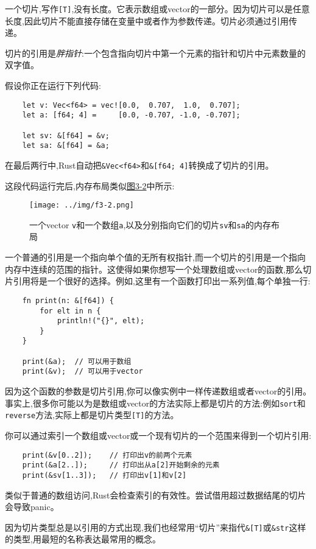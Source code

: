 一个切片,写作\texttt{[T]},没有长度。它表示数组或vector的一部分。因为切片可以是任意长度,因此切片不能直接存储在变量中或者作为参数传递。切片必须通过引用传递。

切片的引用是\emph{胖指针}:一个包含指向切片中第一个元素的指针和切片中元素数量的双字值。

假设你正在运行下列代码:
\begin{verbatim}
    let v: Vec<f64> = vec![0.0,  0.707,  1.0,  0.707];
    let a: [f64; 4] =     [0.0, -0.707, -1.0, -0.707];

    let sv: &[f64] = &v;
    let sa: &[f64] = &a;
\end{verbatim}

在最后两行中,Rust自动把\texttt{\&Vec<f64>}和\texttt{\&[f64; 4]}转换成了切片的引用。

这段代码运行完后,内存布局类似\hyperref[f3-2]{图3-2}中所示:
\begin{figure}[htbp]
    \centering
    \texttt{[image: ../img/f3-2.png]}
    \caption{一个vector \texttt{v}和一个数组\texttt{a},以及分别指向它们的切片\texttt{sv}和\texttt{sa}的内存布局}
    \label{f3-2}
\end{figure}

一个普通的引用是一个指向单个值的无所有权指针,而一个切片的引用是一个指向内存中连续的范围的指针。这使得如果你想写一个处理数组或vector的函数,那么切片引用将是一个很好的选择。例如,这里有一个函数打印出一系列值,每个单独一行:
\begin{verbatim}
    fn print(n: &[f64]) {
        for elt in n {
            println!("{}", elt);
        }
    }

    print(&a);  // 可以用于数组
    print(&v);  // 可以用于vector
\end{verbatim}

因为这个函数的参数是切片引用,你可以像实例中一样传递数组或者vector的引用。事实上,很多你可能以为是数组或vector的方法实际上都是切片的方法:例如\texttt{sort}和\texttt{reverse}方法,实际上都是切片类型\texttt{[T]}的方法。

你可以通过索引一个数组或vector或一个现有切片的一个范围来得到一个切片引用:
\begin{verbatim}
    print(&v[0..2]);    // 打印出v的前两个元素
    print(&a[2..]);     // 打印出从a[2]开始剩余的元素
    print(&sv[1..3]);   // 打印出v[1]和v[2]
\end{verbatim}

类似于普通的数组访问,Rust会检查索引的有效性。尝试借用超过数据结尾的切片会导致panic。

因为切片类型总是以引用的方式出现,我们也经常用“切片”来指代\texttt{\&[T]}或\texttt{\&str}这样的类型,用最短的名称表达最常用的概念。


